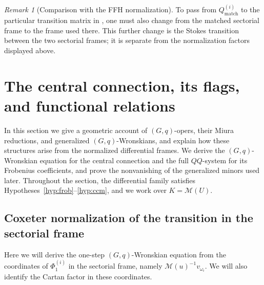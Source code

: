 \documentclass[11pt,leqno]{amsart}
\numberwithin{equation}{section}
\theoremstyle{plain}
\theoremstyle{definition}
\theoremstyle{plain}
\theoremstyle{definition}
\theoremstyle{remark}
\newtheorem{remark}[theorem]{Remark}
\begin{document}
\begin{remark}[Comparison with the FFH normalization]
To pass from $Q_{\mathrm{match}}^{(i)}$ to the particular transition matrix in \cite[Section~3.3, (3.47)--(3.49)]{MR2024}, one must also change from the matched sectorial frame to the frame used there.  This further change is the Stokes transition between the two sectorial frames; it is separate from the normalization factors displayed above.
\end{remark}


\section{The central connection, its flags, and functional relations}\label{sec:central-functional}
In this section we give a geometric account of $(G,q)$-opers, their Miura reductions, and generalized $(G,q)$-Wronskians, and explain how these structures arise from the normalized differential frames.  We derive the $(G,q)$-Wronskian equation for the central connection and the full $QQ$-system for its Frobenius coefficients, and prove the nonvanishing of the generalized minors used later.  Throughout the section, the differential family satisfies Hypotheses~\ref{hyp:frob}--\ref{hyp:ccm}, and we work over $K=\mathcal M(U)$.

\subsection{Coxeter normalization of the transition in the sectorial frame}\label{sec:infinity-Coxeter-normalization}
Here we will derive the one-step $(G,q)$-Wronskian equation from the coordinates of $\Phi_1^{(i)}$ in the sectorial frame, namely $\mathscr M(u)^{-1}v_{\omega_i}$. We will also identify the Cartan factor in these coordinates.
\end{document}
